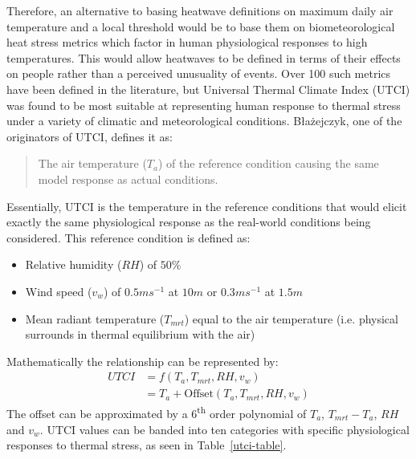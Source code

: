 \documentclass[10pt,letterpaper]{article}
\begin{document}
Therefore, an alternative to basing heatwave definitions on maximum daily air temperature and a local threshold would be to base them on biometeorological heat stress metrics which factor in human physiological responses to high temperatures.
This would allow heatwaves to be defined in terms of their effects on people rather than a perceived unusuality of events.
Over 100 such metrics have been defined in the literature, but Universal Thermal Climate Index (UTCI) was found to be most suitable at representing human response to thermal stress under a variety of climatic and meteorological conditions.\cite{Blazejczyk2012, DiNapoli2018, Zare2018}
Błażejczyk, one of the originators of UTCI, defines it as:
\begin{quote}
    The air temperature ($T_a$) of the reference condition causing the same model response as actual conditions.\cite{Blazejczyk2012}
\end{quote}
Essentially, UTCI is the temperature in the reference conditions that would elicit exactly the same physiological response as the real-world conditions being considered.
This reference condition is defined as:
\begin{itemize}
    \item Relative humidity ($RH$) of $50\%$
    \item Wind speed ($v_w$) of $0.5 ms^{-1}$ at $10 m$ or $0.3 ms^{-1}$ at $1.5 m$
    \item Mean radiant temperature ($T_{mrt}$) equal to the air temperature (i.e. physical surrounds in thermal equilibrium with the air)
\end{itemize}
Mathematically the relationship can be represented by:
\begin{align*}
    UTCI &= f(T_a, T_{mrt}, RH, v_w) \\
    &= T_a + \text{Offset}(T_a, T_{mrt}, RH, v_w)
\end{align*}
The offset can be approximated by a 6\textsuperscript{th} order polynomial of $T_a$, $T_{mrt}-T_a$, $RH$ and $v_w$.
UTCI values can be banded into ten categories with specific physiological responses to thermal stress, as seen in Table~\ref{utci-table}.
\end{document}
